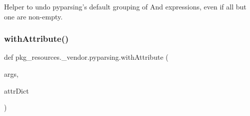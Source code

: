 \begin{DoxyVerb}Helper to undo pyparsing's default grouping of And expressions, even
if all but one are non-empty.
\end{DoxyVerb}
 \mbox{\label{namespacepkg__resources_1_1__vendor_1_1pyparsing_a2afcda3c5f89a43afd1e0298d22c07b1}} 
\subsubsection{\texorpdfstring{with\+Attribute()}{withAttribute()}}
{\footnotesize\ttfamily def pkg\+\_\+resources.\+\_\+vendor.\+pyparsing.\+with\+Attribute (\begin{DoxyParamCaption}\item[{}]{args,  }\item[{}]{attr\+Dict }\end{DoxyParamCaption})}

